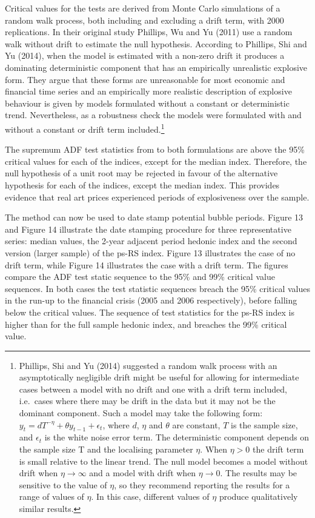 \documentclass[12pt,]{article}
\let\rmarkdownfootnote\footnote%
\def\footnote{\protect\rmarkdownfootnote}
\begin{document}
Critical values for the tests are derived from Monte Carlo simulations
of a random walk process, both including and excluding a drift term,
with 2000 replications. In their original study Phillips, Wu and Yu
(2011) use a random walk without drift to estimate the null hypothesis.
According to Phillips, Shi and Yu (2014), when the model is estimated
with a non-zero drift it produces a dominating deterministic component
that has an empirically unrealistic explosive form. They argue that
these forms are unreasonable for most economic and financial time series
and an empirically more realistic description of explosive behaviour is
given by models formulated without a constant or deterministic trend.
Nevertheless, as a robustness check the models were formulated with and
without a constant or drift term included.\footnote{Phillips, Shi and Yu
  (2014) suggested a random walk process with an asymptotically
  negligible drift might be useful for allowing for intermediate cases
  between a model with no drift and one with a drift term included,
  i.e.~cases where there may be drift in the data but it may not be the
  dominant component. Such a model may take the following form:
  \(y_t = d T^{-\eta} + \theta y_{t-1} + \epsilon_t\), where \(d\),
  \(\eta\) and \(\theta\) are constant, \(T\) is the sample size, and
  \(\epsilon_t\) is the white noise error term. The deterministic
  component depends on the sample size T and the localising parameter
  \(\eta\). When \(\eta > 0\) the drift term is small relative to the
  linear trend. The null model becomes a model without drift when
  \(\eta \to \infty\) and a model with drift when \(\eta \to 0\). The
  results may be sensitive to the value of \(\eta\), so they recommend
  reporting the results for a range of values of \(\eta\). In this case,
  different values of \(\eta\) produce qualitatively similar results.}

The supremum ADF test statistics from to both formulations are above the
95\% critical values for each of the indices, except for the median
index. Therefore, the null hypothesis of a unit root may be rejected in
favour of the alternative hypothesis for each of the indices, except the
median index. This provides evidence that real art prices experienced
periods of explosiveness over the sample.

The method can now be used to date stamp potential bubble periods.
Figure 13 and Figure 14 illustrate the date stamping procedure for three
representative series: median values, the 2-year adjacent period hedonic
index and the second version (larger sample) of the ps-RS index. Figure
13 illustrates the case of no drift term, while Figure 14 illustrates
the case with a drift term. The figures compare the ADF test static
sequence to the 95\% and 99\% critical value sequences. In both cases
the test statistic sequences breach the 95\% critical values in the
run-up to the financial crisis (2005 and 2006 respectively), before
falling below the critical values. The sequence of test statistics for
the ps-RS index is higher than for the full sample hedonic index, and
breaches the 99\% critical value.
\end{document}
